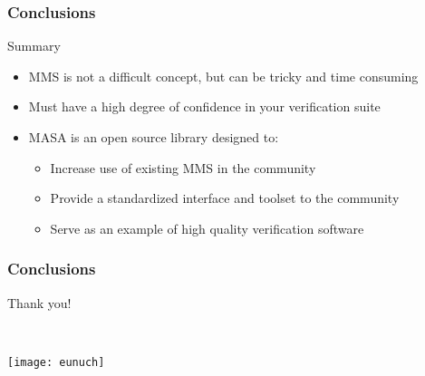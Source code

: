 \documentclass[mathserif]{beamer}
\begin{document}
 \begin{frame}
   \frametitle{Conclusions}

   \begin{block}{Summary}
     \begin{itemize}
      \item MMS is not a difficult concept, but can be tricky and time
	    consuming 
      \item Must have a high degree of confidence in your verification suite
      \item MASA is an open source library designed to:
	    \begin{itemize}
	     \item Increase use of existing MMS in the community
	     \item Provide a standardized interface and toolset to the
		   community
	     \item Serve as an example of high quality verification
		   software
	    \end{itemize}
     \end{itemize}
   \end{block}
 \end{frame}

 \begin{frame}
   \frametitle{Conclusions}

   \begin{block}{}
    \begin{center}
     Thank you!
    \end{center}
     \\
    \end{block}

   \centering
   \texttt{[image: eunuch]}

 \end{frame}


\end{document}
